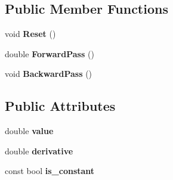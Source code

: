 \subsection*{Public Member Functions}
\begin{DoxyCompactItemize}
\item 
\hypertarget{classautodifk_1_1reverse_1_1_scalar_expression_a73bd698dda18f14f250b1b6998543c7d}{void {\bfseries Reset} ()}\label{classautodifk_1_1reverse_1_1_scalar_expression_a73bd698dda18f14f250b1b6998543c7d}

\item 
\hypertarget{classautodifk_1_1reverse_1_1_scalar_expression_a2fd311a9ed6d6b577e3d8bfa508f778a}{double {\bfseries Forward\-Pass} ()}\label{classautodifk_1_1reverse_1_1_scalar_expression_a2fd311a9ed6d6b577e3d8bfa508f778a}

\item 
\hypertarget{classautodifk_1_1reverse_1_1_scalar_expression_a77e7fb568d55d68da0338e0d9a10d81f}{void {\bfseries Backward\-Pass} ()}\label{classautodifk_1_1reverse_1_1_scalar_expression_a77e7fb568d55d68da0338e0d9a10d81f}

\end{DoxyCompactItemize}
\subsection*{Public Attributes}
\begin{DoxyCompactItemize}
\item 
\hypertarget{classautodifk_1_1reverse_1_1_scalar_expression_ad164d707dec8ddcda763dd4860260466}{double {\bfseries value}}\label{classautodifk_1_1reverse_1_1_scalar_expression_ad164d707dec8ddcda763dd4860260466}

\item 
\hypertarget{classautodifk_1_1reverse_1_1_scalar_expression_a5abc7368882940867c6bd9dd69d78b0d}{double {\bfseries derivative}}\label{classautodifk_1_1reverse_1_1_scalar_expression_a5abc7368882940867c6bd9dd69d78b0d}

\item 
\hypertarget{classautodifk_1_1reverse_1_1_scalar_expression_a41fd95e27f8091019e6b0f8c0888c283}{const bool {\bfseries is\-\_\-constant}}\label{classautodifk_1_1reverse_1_1_scalar_expression_a41fd95e27f8091019e6b0f8c0888c283}

\end{DoxyCompactItemize}
